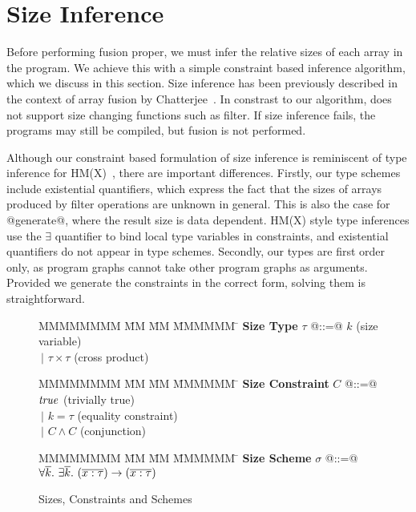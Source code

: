 \section{Size Inference}
Before performing fusion proper, we must infer the relative sizes of each array in the program. We achieve this with a simple constraint based inference algorithm, which we discuss in this section. Size inference has been previously described in the context of array fusion by Chatterjee~\cite{chatterjee1991size}. In constrast to our algorithm, \cite{chatterjee1991size} does not support size changing functions such as filter.
If size inference fails, the programs may still be compiled, but fusion is not performed.

Although our constraint based formulation of size inference is reminiscent of type inference for HM(X)~\cite{odersky1999type}, there are important differences. Firstly, our type schemes include existential quantifiers, which express the fact that the sizes of arrays produced by filter operations are unknown in general. This is also the case for @generate@, where the result size is data dependent. HM(X) style type inferences use the $\exists$ quantifier to bind local type variables in constraints, and existential quantifiers do not appear in type schemes. Secondly, our types are first order only, as program graphs cannot take other program graphs as arguments. Provided we generate the constraints in the correct form, solving them is straightforward.


\begin{figure}
\begin{tabbing}
MMMMMMMM \= MM  \= MM \= MMMMMM \= \kill
\textbf{Size Type}
\> $\tau$   \> @::=@  \> $k$                  \> (size variable)       \\
\>          \> $~|$   \> $\tau \times \tau$   \> (cross product)
\end{tabbing}

\begin{tabbing}
MMMMMMMM \= MM  \= MM \= MMMMMM \= \kill
\textbf{Size Constraint}
\> $C$      \> @::=@  \> $\mathit{true}$               \> (trivially true)      \\
\>          \> $~|$   \> $k = \tau$           \> (equality constraint) \\
\>          \> $~|$   \> $C \wedge C$         \> (conjunction)
\end{tabbing}

\begin{tabbing}
MMMMMMMM \= MM  \= MM \= MMMMMM \= \kill
\textbf{Size Scheme}
\> $\sigma$ \> @::=@  
        \> $\forall \overline{k}.~ \exists \overline{k}.~ (\overline{ x : \tau }) \to (\overline{x : \tau})$
\end{tabbing}

\caption{Sizes, Constraints and Schemes}
\label{f:constraints}
\end{figure}


